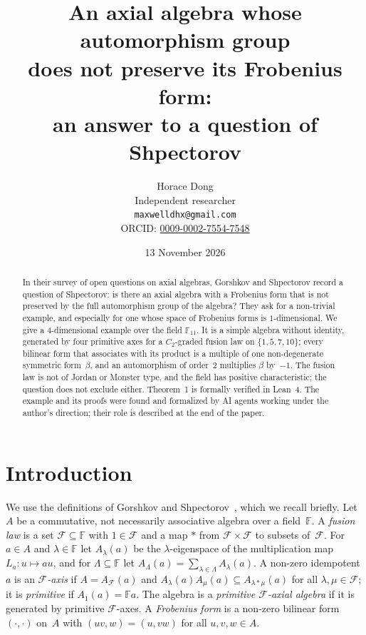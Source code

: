 \documentclass[11pt]{article}
\title{An axial algebra whose automorphism group\\ does not preserve its Frobenius form:\\ an answer to a question of Shpectorov}
\author{Horace Dong\\ \small Independent researcher\\
\small\texttt{maxwelldhx@gmail.com}\\
\small ORCID: \href{https://orcid.org/0009-0002-7554-7548}{0009-0002-7554-7548}}
\date{13 November 2026}
\theoremstyle{remark}
\newcommand{\F}{\mathbb{F}}
\begin{document}
\maketitle

\begin{abstract}
In their survey of open questions on axial algebras, Gorshkov and Shpectorov
record a question of Shpectorov: is there an axial algebra with a Frobenius
form that is not preserved by the full automorphism group of the algebra? They
ask for a non-trivial example, and especially for one whose space of Frobenius
forms is $1$-dimensional. We give a $4$-dimensional example over the field
$\F_{11}$. It is a simple algebra without identity, generated by four primitive
axes for a $C_2$-graded fusion law on $\{1,5,7,10\}$; every bilinear form that
associates with its product is a multiple of one non-degenerate symmetric
form~$\beta$, and an automorphism of order~$2$ multiplies $\beta$ by~$-1$. The
fusion law is not of Jordan or Monster type, and the field has positive
characteristic; the question does not exclude either. Theorem~1 is formally
verified in Lean~4. The example and its proofs were found and formalized by AI
agents working under the author's direction; their role is described at the end
of the paper.
\end{abstract}

\section{Introduction}

We use the definitions of Gorshkov and Shpectorov~\cite[Section~2]{gs}, which
we recall briefly. Let $A$ be a commutative, not necessarily associative algebra
over a field~$\F$. A \emph{fusion law} is a set $\mathcal F\subseteq\F$ with
$1\in\mathcal F$ and a map $\ast$ from $\mathcal F\times\mathcal F$ to subsets
of~$\mathcal F$. For $a\in A$ and $\lambda\in\F$ let $A_\lambda(a)$ be the
$\lambda$-eigenspace of the multiplication map $L_a\colon u\mapsto au$, and for
$\Lambda\subseteq\F$ let $A_\Lambda(a)=\sum_{\lambda\in\Lambda}A_\lambda(a)$. A
non-zero idempotent $a$ is an \emph{$\mathcal F$-axis} if
$A=A_{\mathcal F}(a)$ and $A_\lambda(a)A_\mu(a)\subseteq A_{\lambda\ast\mu}(a)$
for all $\lambda,\mu\in\mathcal F$; it is \emph{primitive} if $A_1(a)=\F a$. The
algebra is a \emph{primitive $\mathcal F$-axial algebra} if it is generated by
primitive $\mathcal F$-axes. A \emph{Frobenius form} is a non-zero bilinear form
$(\cdot,\cdot)$ on~$A$ with $(uv,w)=(u,vw)$ for all $u,v,w\in A$.
\end{document}
